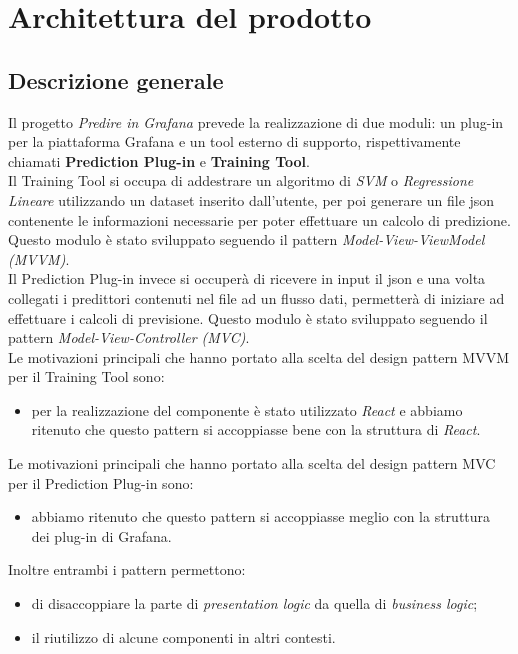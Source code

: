 \section{Architettura del prodotto}

\subsection{Descrizione generale}
Il progetto \textit{Predire in Grafana} prevede la realizzazione di due moduli: un plug-in per la piattaforma Grafana e un tool esterno di supporto, rispettivamente chiamati \textbf{Prediction Plug-in} e \textbf{Training Tool}. \\
Il Training Tool si occupa di addestrare un algoritmo di \textit{SVM} o \textit{Regressione Lineare} utilizzando un dataset inserito dall'utente, per poi generare un file json contenente le informazioni necessarie per poter effettuare un calcolo di predizione. Questo modulo è stato sviluppato seguendo il pattern \textit{Model-View-ViewModel (MVVM)}.\\
Il Prediction Plug-in invece si occuperà di ricevere in input il json e una volta collegati i predittori contenuti nel file ad un flusso dati, permetterà di iniziare ad effettuare i calcoli di previsione. Questo modulo è stato sviluppato seguendo il pattern \textit{Model-View-Controller (MVC)}.\\
Le motivazioni principali che hanno portato alla scelta del design pattern MVVM per il Training Tool sono:
\begin{itemize}
	\item per la realizzazione del componente è stato utilizzato \textit{React} e abbiamo ritenuto che questo pattern si accoppiasse bene con la struttura di \textit{React}.
\end{itemize}
Le motivazioni principali che hanno portato alla scelta del design pattern MVC per il Prediction Plug-in sono:
\begin{itemize}
	\item abbiamo ritenuto che questo pattern si accoppiasse meglio con la struttura dei plug-in di Grafana.
\end{itemize}
Inoltre entrambi i pattern permettono:
\begin{itemize}
	\item di disaccoppiare la parte di \textit{presentation logic} da quella di
\textit{business logic};
	\item il riutilizzo di alcune componenti in altri contesti.
\end{itemize}


